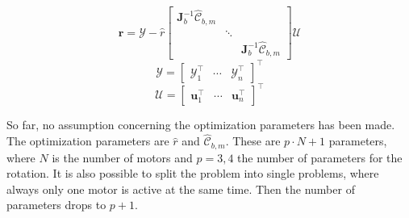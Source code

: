 \begin{equation}
\label{eqn_obj_stacked}
\mathbf{r} = \mathcal{Y} - \hat{r} \left[ \begin{array}{ccc}
\mathbf{J}_b^{-1} \hat{\mathcal{C}}_{b,m} & & \\ 
& \ddots & \\ 
& & \mathbf{J}_b^{-1} \hat{\mathcal{C}}_{b,m}
\end{array} \right]
\mathcal{U}
\end{equation}
\begin{equation}
\mathcal{Y} = \left[ \begin{array}{ccc}
\mathcal{Y}_1^\top & \cdots & \mathcal{Y}_n^\top
\end{array} \right]^\top
\end{equation}
\begin{equation}
\mathcal{U} = \left[ \begin{array}{ccc}
\mathbf{u}_1^\top & \cdots & \mathbf{u}_n^\top
\end{array} \right]^\top
\end{equation}


So far, no assumption concerning the optimization parameters has been made. The optimization parameters are $\hat{r}$ and $\hat{\mathcal{C}}_{b,m}$. These are $p\cdot N+1$ parameters, where $N$ is the number of motors and $p = {3,4}$ the number of parameters for the rotation. It is also possible to split the problem into single problems, where always only one motor is active at the same time. Then the number of parameters drops to $p+1$.

